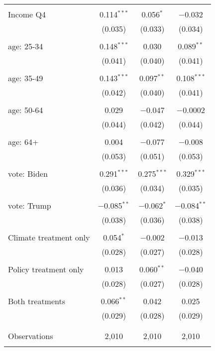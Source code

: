 \begin{tabular}{@{\extracolsep{5pt}}lccc}
  & & & \\ 
 Income Q4 & 0.114$^{***}$ & 0.056$^{*}$ & $-$0.032 \\ 
  & (0.035) & (0.033) & (0.034) \\ 
  & & & \\ 
 age: 25-34 & 0.148$^{***}$ & 0.030 & 0.089$^{**}$ \\ 
  & (0.041) & (0.040) & (0.041) \\ 
  & & & \\ 
 age: 35-49 & 0.143$^{***}$ & 0.097$^{**}$ & 0.108$^{***}$ \\ 
  & (0.042) & (0.040) & (0.041) \\ 
  & & & \\ 
 age: 50-64 & 0.029 & $-$0.047 & $-$0.0002 \\ 
  & (0.044) & (0.042) & (0.044) \\ 
  & & & \\ 
 age: 64+ & 0.004 & $-$0.077 & $-$0.008 \\ 
  & (0.053) & (0.051) & (0.053) \\ 
  & & & \\ 
 vote: Biden & 0.291$^{***}$ & 0.275$^{***}$ & 0.329$^{***}$ \\ 
  & (0.036) & (0.034) & (0.035) \\ 
  & & & \\ 
 vote: Trump & $-$0.085$^{**}$ & $-$0.062$^{*}$ & $-$0.084$^{**}$ \\ 
  & (0.038) & (0.036) & (0.038) \\ 
  & & & \\ 
 Climate treatment only & 0.054$^{*}$ & $-$0.002 & $-$0.013 \\ 
  & (0.028) & (0.027) & (0.028) \\ 
  & & & \\ 
 Policy treatment only & 0.013 & 0.060$^{**}$ & $-$0.040 \\ 
  & (0.028) & (0.027) & (0.028) \\ 
  & & & \\ 
 Both treatments & 0.066$^{**}$ & 0.042 & 0.025 \\ 
  & (0.029) & (0.028) & (0.029) \\ 
  & & & \\ 
\hline \\[-1.8ex] 

Observations & 2,010 & 2,010 & 2,010 \\ 
\hline 
\hline \\[-1.8ex] 
\end{tabular} 